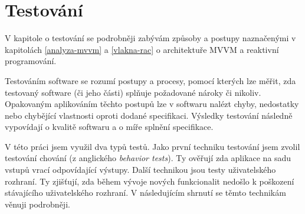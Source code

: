 \chapter{Testování}\label{testovani}



V kapitole o testování se podrobněji zabývám způsoby a postupy naznačenými v kapitolách \ref{analyza-mvvm} a \ref{vlakna-rac} o architektuře MVVM a reaktivní programování.

Testováním software se rozumí postupy a procesy, pomocí kterých lze měřit, zda testovaný software (či jeho části) splňuje požadované nároky či nikoliv.
Opakovaným aplikováním těchto postupů lze v softwaru nalézt chyby, nedostatky nebo chybějící vlastnosti oproti dodané specifikaci.
Výsledky testování následně vypovídají o kvalitě softwaru a o míře splnění specifikace. \cite{software-testing-definition}

V této práci jsem využil dva typů testů.
Jako první techniku testování jsem zvolil testování chování (z anglického \textit{behavior tests}).
Ty ověřují zda aplikace na sadu vstupů vrací odpovídající výstupy.
Další technikou jsou testy uživatelského rozhraní.
Ty zjišťují, zda během vývoje nových funkcionalit nedošlo k poškození stávajícího uživatelského rozhraní.
V následujícím shrnutí se těmto technikám věnuji podrobněji.







